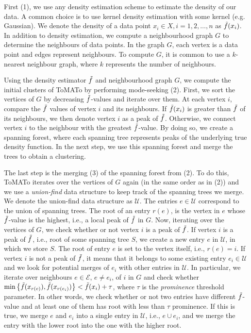 First (1), we use any density estimation scheme to estimate the density of our data. A common choice is to use kernel density estimation with some kernel (e.g. Gaussian). We denote the density of a data point $x_i \in X, i = 1, 2, \ldots, n$ as $\Tilde{f}(x_i)$. In addition to density estimation, we compute a neighbourhood graph $G$ to determine the neighbours of data points. In the graph $G$, each vertex is a data point and edges represent neighbours. To compute $G$, it is common to use a $k$-nearest neighbour graph, where $k$ represents the number of neighbours.

Using the density estimator $\Tilde{f}$ and neighbourhood graph $G$, we compute the initial clusters of ToMATo by performing mode-seeking (2). First, we sort the vertices of $G$ by decreasing $\Tilde{f}$-values and iterate over them. At each vertex $i$, compare the $\Tilde{f}$ values of vertex $i$ and its neighbours. If $\Tilde{f}(x_i)$ is greater than $\Tilde{f}$ of its neighbours, we then denote vertex $i$ as a peak of $\Tilde{f}$. Otherwise, we connect vertex $i$ to the neighbour with the greatest $\Tilde{f}$-value. By doing so, we create a spanning forest, where each spanning tree represents peaks of the underlying true density function. In the next step, we use this spanning forest and merge the trees to obtain a clustering.

The last step is the merging (3) of the spanning forest from (2). To do this, ToMATo iterates over the vertices of $G$ again (in the same order as in (2)) and we use a \textit{union-find} data structure to keep track of the spanning trees we merge. We denote the union-find data structure as $\mathcal{U}$. The entries $e \in \mathcal{U}$ correspond to the union of spanning trees. The root of an entry $r(e)$, is the vertex in $e$ whose $\Tilde{f}$-value is the highest, i.e., a local peak of $\Tilde{f}$ in $G$. Now, iterating over the vertices of $G$, we check whether or not vertex $i$ is a peak of $\Tilde{f}$. If vertex $i$ is a peak of $\Tilde{f}$, i.e., root of some spanning tree $S$, we create a new entry $e$ in $\mathcal{U}$, in which we store $S$. The root of entry $e$ is set to the vertex itself, i.e., $r(e) = i$. If vertex $i$ is not a peak of $\Tilde{f}$, it means that it belongs to some existing entry $e_i \in \mathcal{U}$ and we look for potential merges of $e_i$ with other entries in $\mathcal{U}$. In particular, we iterate over neighbours $e \in \mathcal{E}$, $e \neq e_i$, of $i$ in $G$ and check whether $\min \left\{ \Tilde{f}(x_{r(e)}), \Tilde{f}(x_{r(e_i)}) \right\} < \Tilde{f}(x_i) + \tau$, where $\tau$ is the \textit{prominence} threshold parameter. In other words, we check whether or not two entries have different $\Tilde{f}$-value and at least one of them has root with less than $\tau$ prominence. If this is true, we merge $e$ and $e_i$ into a single entry in $\mathcal{U}$, i.e., $e \cup e_i$, and we merge the entry with the lower root into the one with the higher root.


